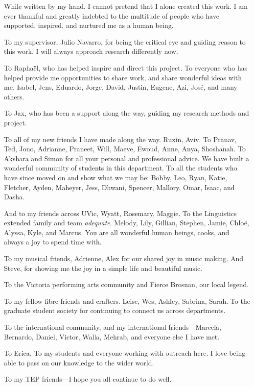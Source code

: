 While written by my hand, I cannot pretend that I alone created this
work. I am ever thankful and greatly indebted to the multitude of people
who have supported, inspired, and nurtured me as a human being.

To my supervisor, Julio Navarro, for being the critical eye and guiding
reason to this work. I will always approach research differently now.

To Raphaël, who has helped inspire and direct this project. To everyone
who has helped provide me opportunities to share work, and share
wonderful ideas with me. Isabel, Jens, Eduardo, Jorge, David, Justin,
Eugene, Azi, José, and many others.

To Jax, who has been a support along the way, guiding my research
methods and project.

To all of my new friends I have made along the way. Ruxin, Aviv. To
Pranav, Ted, Jono, Adrianne, Praneet, Will, Maeve, Ewoud, Anne, Anya,
Shoshanah. To Akshara and Simon for all your personal and professional
advice. We have built a wonderful community of students in this
department. To all the students who have since moved on and show what we
may be: Bobby, Leo, Ryan, Katie, Fletcher, Ayden, Maheyer, Jess, Dhwani,
Spencer, Mallory, Omar, Isaac, and Dasha.

And to my friends across UVic, Wyatt, Rosemary, Maggie. To the
Linguistics extended family and team \emph{adequate}. Melody, Lily,
Gillian, Stephen, Jamie, Chloë, Alyssa, Kyle, and Marcus. You are all
wonderful human beings, cooks, and always a joy to spend time with.

To my musical friends, Adrienne, Alex for our shared joy in music
making. And Steve, for showing me the joy in a simple life and beautiful
music.

To the Victoria performing arts community and Fierce Brosnan, our local
legend.

To my fellow fibre friends and crafters. Leise, Wes, Ashley, Sabrina,
Sarah. To the graduate student society for continuing to connect us
across departments.

To the international community, and my international friends---Marcela,
Bernardo, Daniel, Victor, Walla, Mehrab, and everyone else I have met.

To Erica. To my students and everyone working with outreach here. I love
being able to pass on our knowledge to the wider world.

To my TEP friends---I hope you all continue to do well.

